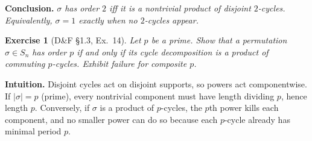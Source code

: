 \documentclass[12pt]{article}
\newtheorem{exercise}[theorem]{Exercise}
\theoremstyle{definition}
\begin{document}
\textbf{Conclusion.} \emph{$\sigma$ has order $2$ iff it is a nontrivial product of disjoint $2$-cycles.
Equivalently, $\sigma=1$ exactly when no $2$-cycles appear.}


\newpage

\begin{exercise}[D\&F §1.3, Ex.~14]
Let $p$ be a prime. Show that a permutation $\sigma\in S_n$ has order $p$ if and only if
its cycle decomposition is a product of commuting $p$-cycles. Exhibit failure for composite $p$.
\end{exercise}

\dotfill

\noindent\textbf{Intuition.}
Disjoint cycles act on disjoint supports, so powers act componentwise.
If $|\sigma|=p$ (prime), every nontrivial component must have length dividing $p$, hence length $p$.
Conversely, if $\sigma$ is a product of $p$-cycles, the $p$th power kills each component, and no smaller
power can do so because each $p$-cycle already has minimal period $p$.

\dotfill
\end{document}
